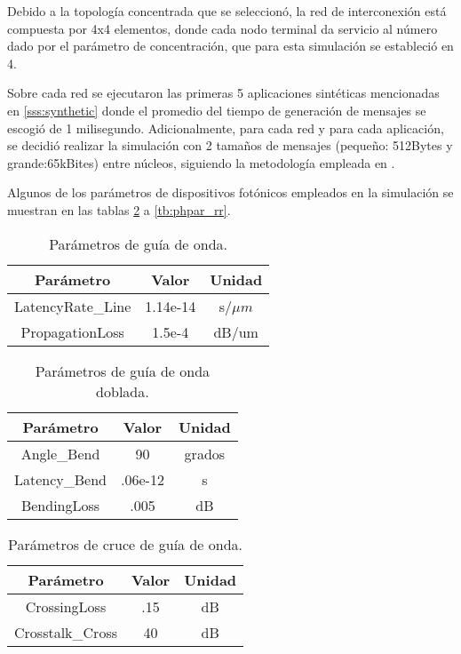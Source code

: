 Debido a la topología concentrada que se seleccionó, la red de interconexión 
está compuesta por 4x4 elementos, donde cada nodo terminal da servicio al 
número dado por el parámetro de concentración, que para esta simulación se estableció
en 4.

Sobre cada red se ejecutaron las primeras 5 aplicaciones sintéticas
mencionadas en \ref{sss:synthetic} donde el promedio del tiempo
de generación de mensajes se escogió de 1 milisegundo. Adicionalmente,
para cada red y para cada aplicación, se decidió realizar la simulación
con 2 tamaños de mensajes (pequeño: 512Bytes y grande:65kBites) entre núcleos,
siguiendo la metodología empleada en \cite{hendry2009analysis}.

Algunos de los parámetros de dispositivos fotónicos
empleados en la simulación se muestran en las tablas 
\ref{tb:phpar_wgb} a \ref{tb:phpar_rr}.

\begin{table}[H]
\centering
\begin{tabular}{|c|c|c|}
\hline
Parámetro & Valor & Unidad \\ 
\hline
LatencyRate\_Line & 1.14e-14 &s/$\mu m$ \\
PropagationLoss & 1.5e-4 & dB/um \\
\hline
\end{tabular}
\caption{Parámetros de guía de onda. \cite{xia2006ultracompact} \cite{gnan2008fabrication}}
\label{tb:phpar_wg}
\end{table} 

\begin{table}[H]
\centering
\begin{tabular}{|c|c|c|}
\hline
Parámetro & Valor & Unidad \\ 
\hline
Angle\_Bend & 90 & grados \\
Latency\_Bend & .06e-12 &s \\
BendingLoss & .005 & dB \\
\hline
\end{tabular}
\caption{Parámetros de guía de onda doblada. \cite{xia2006ultracompact}}
\label{tb:phpar_wgb}
\end{table} 

\begin{table}[H]
\centering
\begin{tabular}{|c|c|c|}
\hline
Parámetro & Valor & Unidad \\ 
\hline
CrossingLoss & .15   & dB\\
Crosstalk\_Cross & 40 &dB\\
\hline
\end{tabular}
\caption{Parámetros de cruce de guía de onda. \cite{bogaerts2007low}}
\label{tb:phpar_wgc}
\end{table} 

